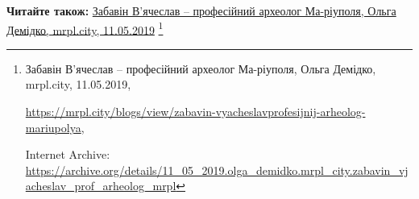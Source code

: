  
 
 
 
 

\def\pubIA{https://archive.org/details/11_05_2019.olga_demidko.mrpl_city.zabavin_vjacheslav_prof_arheolog_mrpl}
\def\pubTitle{Забавін В'ячеслав – професійний археолог Ма\hyp{}ріуполя}
\def\pubDate{11.05.2019}
\def\pubOrigin{https://mrpl.city/blogs/view/zabavin-vyacheslavprofesijnij-arheolog-mariupolya}
\def\pubAuthor{Ольга Демідко}

\textbf{Читайте також:} \href{\pubIA}{%
\pubTitle, \pubAuthor, mrpl.city, \pubDate}%
\footnote{\pubTitle, \pubAuthor, mrpl.city, \pubDate, \par\url{\pubOrigin}, \par Internet Archive: \url{\pubIA}}
